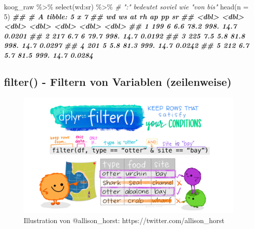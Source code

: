 \documentclass[
]{article}
\newenvironment{Shaded}{\begin{snugshade}}{\end{snugshade}}
\newcommand{\AttributeTok}[1]{\textcolor[rgb]{0.77,0.63,0.00}{#1}}
\newcommand{\CommentTok}[1]{\textcolor[rgb]{0.56,0.35,0.01}{\textit{#1}}}
\newcommand{\DecValTok}[1]{\textcolor[rgb]{0.00,0.00,0.81}{#1}}
\newcommand{\DocumentationTok}[1]{\textcolor[rgb]{0.56,0.35,0.01}{\textbf{\textit{#1}}}}
\newcommand{\FunctionTok}[1]{\textcolor[rgb]{0.00,0.00,0.00}{#1}}
\newcommand{\NormalTok}[1]{#1}
\newcommand{\SpecialCharTok}[1]{\textcolor[rgb]{0.00,0.00,0.00}{#1}}
\begin{document}
\begin{Shaded}
\begin{Highlighting}[]
\NormalTok{koog\_raw }\SpecialCharTok{\%\textgreater{}\%}
  \FunctionTok{select}\NormalTok{(wd}\SpecialCharTok{:}\NormalTok{sr) }\SpecialCharTok{\%\textgreater{}\%} \CommentTok{\# ":" bedeutet soviel wie "von bis"}
  \FunctionTok{head}\NormalTok{(}\AttributeTok{n =} \DecValTok{5}\NormalTok{)}
\DocumentationTok{\#\# \# A tibble: 5 x 7}
\DocumentationTok{\#\#      wd    ws    at    rh    ap    pp     sr}
\DocumentationTok{\#\#   \textless{}dbl\textgreater{} \textless{}dbl\textgreater{} \textless{}dbl\textgreater{} \textless{}dbl\textgreater{} \textless{}dbl\textgreater{} \textless{}dbl\textgreater{}  \textless{}dbl\textgreater{}}
\DocumentationTok{\#\# 1   199   6     6.6  78.2  998.  14.7 0.0201}
\DocumentationTok{\#\# 2   217   6.7   6    79.7  998.  14.7 0.0192}
\DocumentationTok{\#\# 3   225   7.5   5.8  81.8  998.  14.7 0.0297}
\DocumentationTok{\#\# 4   201   5     5.8  81.3  999.  14.7 0.0242}
\DocumentationTok{\#\# 5   212   6.7   5.7  81.5  999.  14.7 0.0284}
\end{Highlighting}
\end{Shaded}

\hypertarget{filter---filtern-von-variablen-zeilenweise}{%
\subsection{filter() - Filtern von Variablen (zeilenweise)}\label{filter---filtern-von-variablen-zeilenweise}}

\begin{figure}

{\centering \includegraphics[width=94.78in]{images/033} 

}

\caption{Illustration von @allison_horst: https://twitter.com/allison_horst}\label{fig:unnamed-chunk-126}
\end{figure}
\end{document}
